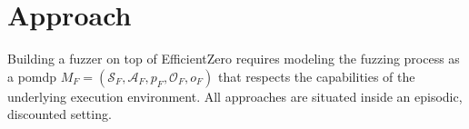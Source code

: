 \chapter{Approach}\label{chap:fuzzing-mdp}

Building a fuzzer on top of EfficientZero requires modeling the fuzzing process
as a \gls{pomdp} $M_F=(\mathcal{S}_F,\mathcal{A}_F,p_F,\mathcal{O}_F,o_F)$ that respects
the capabilities of the underlying execution environment.
All approaches are situated inside an episodic, discounted setting.




